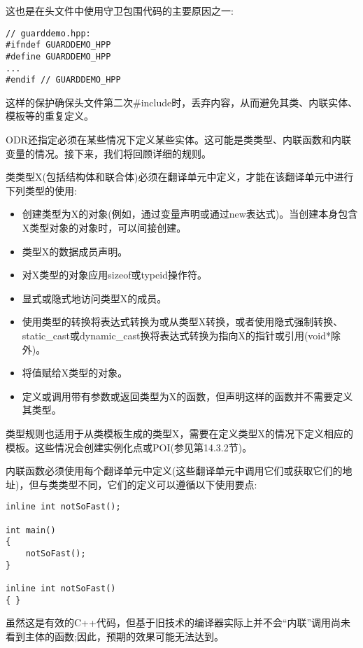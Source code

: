 这也是在头文件中使用守卫包围代码的主要原因之一:

\begin{lstlisting}[style=styleCXX]
// guarddemo.hpp:
#ifndef GUARDDEMO_HPP
#define GUARDDEMO_HPP
...
#endif // GUARDDEMO_HPP
\end{lstlisting}

这样的保护确保头文件第二次\#include时，丢弃内容，从而避免其类、内联实体、模板等的重复定义。

ODR还指定必须在某些情况下定义某些实体。这可能是类类型、内联函数和内联变量的情况。接下来，我们将回顾详细的规则。

类类型X(包括结构体和联合体)必须在翻译单元中定义，才能在该翻译单元中进行下列类型的使用:

\begin{itemize}
\item 
创建类型为X的对象(例如，通过变量声明或通过new表达式)。当创建本身包含X类型对象的对象时，可以间接创建。

\item 
类型X的数据成员声明。

\item 
对X类型的对象应用sizeof或typeid操作符。

\item 
显式或隐式地访问类型X的成员。

\item 
使用类型的转换将表达式转换为或从类型X转换，或者使用隐式强制转换、static\_cast或dynamic\_cast换将表达式转换为指向X的指针或引用(void*除外)。

\item 
将值赋给X类型的对象。

\item 
定义或调用带有参数或返回类型为X的函数，但声明这样的函数并不需要定义其类型。
\end{itemize}

类型规则也适用于从类模板生成的类型X，需要在定义类型X的情况下定义相应的模板。这些情况会创建实例化点或POI(参见第14.3.2节)。

内联函数必须使用每个翻译单元中定义(这些翻译单元中调用它们或获取它们的地址)，但与类类型不同，它们的定义可以遵循以下使用要点:

\begin{lstlisting}[style=styleCXX]
inline int notSoFast();

int main()
{
	notSoFast();
}

inline int notSoFast()
{ }
\end{lstlisting}

虽然这是有效的C++代码，但基于旧技术的编译器实际上并不会“内联”调用尚未看到主体的函数;因此，预期的效果可能无法达到。

